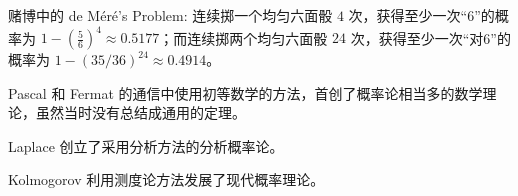 \documentclass[../main.tex]{subfiles}
\begin{document}
赌博中的 de Méré's Problem: 连续掷一个均匀六面骰 $4$ 次，获得至少一次“6”的概率为 $1-(\frac{5}{6})^4\approx0.5177$；而连续掷两个均匀六面骰 $24$ 次，获得至少一次“对6”的概率为 $1-(35/36)^{24}\approx0.4914$。

Pascal 和 Fermat 的通信中使用初等数学的方法，首创了概率论相当多的数学理论，虽然当时没有总结成通用的定理。

Laplace 创立了采用分析方法的分析概率论。

Kolmogorov 利用测度论方法发展了现代概率理论。
\end{document}
